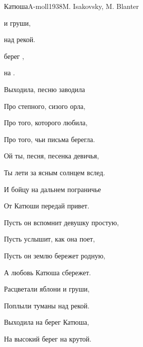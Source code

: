 \begin{song}{Катюша}{A-moll}{1938}{M. Isakovsky, M. Blanter}{}{}
  \begin{SBVerse}
      и груши,

      над рекой.

      берег ,

       на .
  \end{SBVerse}
  \begin{SBVerse}
    Выходила, песню заводила

    Про степного, сизого орла,

    Про того, которого любила,

    Про того, чьи письма берегла.
  \end{SBVerse}
  \begin{SBVerse}
    Ой ты, песня, песенка девичья,

    Ты лети за ясным солнцем вслед.

    И бойцу на дальнем пограничье

    От Катюши передай привет.
  \end{SBVerse}
  \begin{SBVerse}
    Пусть он вспомнит девушку простую,

    Пусть услышит, как она поет,

    Пусть он землю бережет родную,

    А любовь Катюша сбережет.
  \end{SBVerse}
  \begin{SBVerse}
    Расцветали яблони и груши,

    Поплыли туманы над рекой.

    Выходила на берег Катюша,

    На высокий берег на крутой.
  \end{SBVerse}
\end{song}
